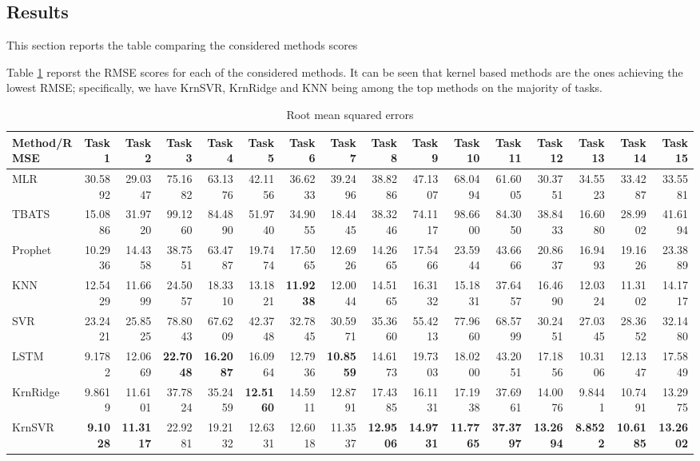 \subsection{Results}
This section reports the table comparing the considered methods scores 

Table \ref{tab:point_RMSE} reporst the RMSE scores for each of the considered methods. It can be seen that kernel based methods are the ones achieving the lowest RMSE; specifically, we have KrnSVR, KrnRidge and KNN being among the top methods on the majority of tasks.

\begin{table}[!ht]
    \caption{Root mean squared errors}
    \label{tab:point_RMSE}
    \begin{adjustbox}{width=\textwidth}
        \begin{tabular}{lrrrrrrrrrrrrrrr}
            \toprule
            Method/RMSE & Task 1 & Task 2 & Task 3 & Task 4 & Task 5 & Task 6 & Task 7 & Task 8 & Task 9 & Task 10 & Task 11 & Task 12 & Task 13 & Task 14 & Task 15 \\
            \midrule
            MLR & 30.5892 & 29.0347 & 75.1682 & 63.1376 & 42.1156 & 36.6233 & 39.2496 & 38.8286 & 47.1307 & 68.0494 & 61.6005 & 30.3751 & 34.5523 & 33.4287 & 33.5581 \\
            TBATS & 15.0886 & 31.9720 & 99.1260 & 84.4890 & 51.9740 & 34.9055 & 18.4445 & 38.3246 & 74.1117 & 98.6600 & 84.3050 & 38.8433 & 16.6080 & 28.9902 & 41.6194 \\
            Prophet & 10.2936 & 14.4358 & 38.7551 & 63.4787 & 19.7474 & 17.5065 & 12.6926 & 14.2665 & 17.5466 & 23.5944 & 43.6666 & 20.8637 & 16.9493 & 19.1626 & 23.3889 \\
            KNN & 12.5429 & 11.6699 & 24.5057 & 18.3310 & 13.1821 & \textbf{11.9238} & 12.0044 & 14.5165 & 16.3132 & 15.1831 & 37.6457 & 16.4690 & 12.0324 & 11.3102 & 14.1717 \\
            SVR & 23.2421 & 25.8525 & 78.8043 & 67.6209 & 42.3748 & 32.7845 & 30.5971 & 35.3660 & 55.4213 & 77.9660 & 68.5799 & 30.2451 & 27.0345 & 28.3652 & 32.1480 \\
            LSTM & 9.1782 & 12.0669 & \textbf{22.7048} & \textbf{16.2087} & 16.0964 & 12.7936 & \textbf{10.8559} & 14.6173 & 19.7303 & 18.0200 & 43.2051 & 17.1856 & 10.3106 & 12.1347 & 17.5849 \\
            KrnRidge & 9.8619 & 11.6101 & 37.7824 & 35.2459 & \textbf{12.5160} & 14.5911 & 12.8791 & 17.4385 & 16.1131 & 17.1938 & 37.6961 & 14.0076 & 9.8441 & 10.7491 & 13.2975 \\
            KrnSVR & \textbf{9.1028} & \textbf{11.3117} & 22.9281 & 19.2132 & 12.6331 & 12.6018 & 11.3537 & \textbf{12.9506} & \textbf{14.9731} & \textbf{11.7765} & \textbf{37.3797} & \textbf{13.2694} & 
            \textbf{8.8522} & \textbf{10.6185} & \textbf{13.2602} \\
            \bottomrule
            \end{tabular}            
    \end{adjustbox}
\end{table}


